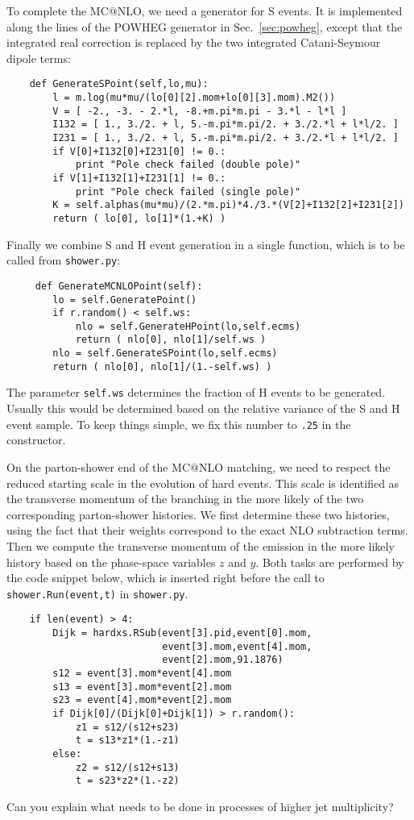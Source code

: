 \documentclass[10pt,fleqn]{scrartcl}
\begin{document}
To complete the MC@NLO, we need a generator for S events. It is implemented
along the lines of the POWHEG generator in Sec.~\ref{sec:powheg}, except that 
the integrated real correction is replaced by the two integrated Catani-Seymour 
dipole terms:
\begin{verbatim}
    def GenerateSPoint(self,lo,mu):
        l = m.log(mu*mu/(lo[0][2].mom+lo[0][3].mom).M2())
        V = [ -2., -3. - 2.*l, -8.+m.pi*m.pi - 3.*l - l*l ]
        I132 = [ 1., 3./2. + l, 5.-m.pi*m.pi/2. + 3./2.*l + l*l/2. ]
        I231 = [ 1., 3./2. + l, 5.-m.pi*m.pi/2. + 3./2.*l + l*l/2. ]
        if V[0]+I132[0]+I231[0] != 0.:
            print "Pole check failed (double pole)"
        if V[1]+I132[1]+I231[1] != 0.:
            print "Pole check failed (single pole)"
        K = self.alphas(mu*mu)/(2.*m.pi)*4./3.*(V[2]+I132[2]+I231[2])
        return ( lo[0], lo[1]*(1.+K) )
\end{verbatim}
Finally we combine S and H event generation in a single function,
which is to be called from {\tt shower.py}:
\begin{verbatim}
     def GenerateMCNLOPoint(self):
        lo = self.GeneratePoint()
        if r.random() < self.ws:
            nlo = self.GenerateHPoint(lo,self.ecms)
            return ( nlo[0], nlo[1]/self.ws )
        nlo = self.GenerateSPoint(lo,self.ecms)
        return ( nlo[0], nlo[1]/(1.-self.ws) )
\end{verbatim}
The parameter \verb!self.ws! determines the fraction of H events to be
generated. Usually this would be determined based on the relative
variance of the S and H event sample. To keep things simple, we fix
this number to \verb!.25! in the constructor.

On the parton-shower end of the MC@NLO matching, we need to respect
the reduced starting scale in the evolution of hard events. This scale
is identified as the transverse momentum of the branching in the more
likely of the two corresponding parton-shower histories.
We first determine these two histories, using the fact that their weights 
correspond to the exact NLO subtraction terms.
Then we compute the transverse momentum of the emission in the more likely 
history based on the phase-space variables $z$ and $y$. Both tasks
are performed by the code snippet below, which is inserted right before 
the call to \verb!shower.Run(event,t)! in {\tt shower.py}.
\begin{verbatim}
    if len(event) > 4:
        Dijk = hardxs.RSub(event[3].pid,event[0].mom,
                           event[3].mom,event[4].mom,
                           event[2].mom,91.1876)
        s12 = event[3].mom*event[4].mom
        s13 = event[3].mom*event[2].mom
        s23 = event[4].mom*event[2].mom
        if Dijk[0]/(Dijk[0]+Dijk[1]) > r.random():
            z1 = s12/(s12+s23)
            t = s13*z1*(1.-z1)
        else:
            z2 = s12/(s12+s13)
            t = s23*z2*(1.-z2)
\end{verbatim}
Can you explain what needs to be done in processes of higher jet multiplicity?
\end{document}
